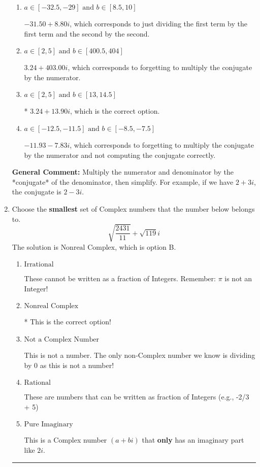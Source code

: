 \documentclass{extbook}[14pt]
\newcommand{\litem}[1]{\item #1

\rule{\textwidth}{0.4pt}}
\begin{document}
\begin{enumerate}
{\begin{enumerate}[label=\Alph*.]
 $94.00  + 13.90 i$, which corresponds to forgetting to multiply the conjugate by the numerator and using a plus instead of a minus in the denominator.
\item \( a \in [-32.5, -29] \text{ and } b \in [8.5, 10] \)

 $-31.50  + 8.80 i$, which corresponds to just dividing the first term by the first term and the second by the second.
\item \( a \in [2, 5] \text{ and } b \in [400.5, 404] \)

 $3.24  + 403.00 i$, which corresponds to forgetting to multiply the conjugate by the numerator.
\item \( a \in [2, 5] \text{ and } b \in [13, 14.5] \)

* $3.24  + 13.90 i$, which is the correct option.
\item \( a \in [-12.5, -11.5] \text{ and } b \in [-8.5, -7.5] \)

 $-11.93  - 7.83 i$, which corresponds to forgetting to multiply the conjugate by the numerator and not computing the conjugate correctly.
\end{enumerate}

\textbf{General Comment:} Multiply the numerator and denominator by the *conjugate* of the denominator, then simplify. For example, if we have $2+3i$, the conjugate is $2-3i$.
}
\litem{
Choose the \textbf{smallest} set of Complex numbers that the number below belongs to.
\[ \sqrt{\frac{2431}{11}}+\sqrt{119} i \]
The solution is \( \text{Nonreal Complex} \), which is option B.\begin{enumerate}[label=\Alph*.]
\item \( \text{Irrational} \)

These cannot be written as a fraction of Integers. Remember: $\pi$ is not an Integer!
\item \( \text{Nonreal Complex} \)

* This is the correct option!
\item \( \text{Not a Complex Number} \)

This is not a number. The only non-Complex number we know is dividing by 0 as this is not a number!
\item \( \text{Rational} \)

These are numbers that can be written as fraction of Integers (e.g., -2/3 + 5)
\item \( \text{Pure Imaginary} \)

This is a Complex number $(a+bi)$ that \textbf{only} has an imaginary part like $2i$.
\end{enumerate}

}
\end{enumerate}
\end{document}
